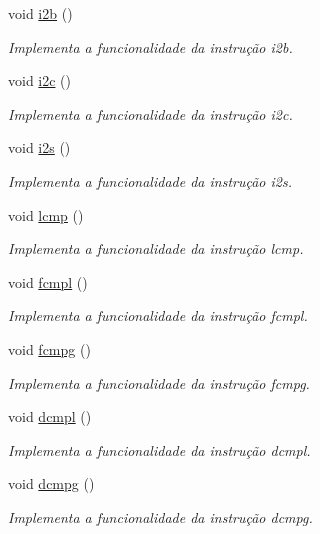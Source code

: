\begin{DoxyCompactItemize}
void \hyperlink{classOperations_adfe0344bae5a1252330b7324e827ed35}{i2b} ()
\begin{DoxyCompactList}\small\item\em Implementa a funcionalidade da instrução i2b. \end{DoxyCompactList}\item 
void \hyperlink{classOperations_a43b01132bf9acf598d0ced8719c194c7}{i2c} ()
\begin{DoxyCompactList}\small\item\em Implementa a funcionalidade da instrução i2c. \end{DoxyCompactList}\item 
void \hyperlink{classOperations_ab83ebb06495a6e42c5edeec05e312f8c}{i2s} ()
\begin{DoxyCompactList}\small\item\em Implementa a funcionalidade da instrução i2s. \end{DoxyCompactList}\item 
void \hyperlink{classOperations_a7ad4ad0e417096686b55dde9142b830a}{lcmp} ()
\begin{DoxyCompactList}\small\item\em Implementa a funcionalidade da instrução lcmp. \end{DoxyCompactList}\item 
void \hyperlink{classOperations_aa4a8e2be93a5cc69e40f483958014e39}{fcmpl} ()
\begin{DoxyCompactList}\small\item\em Implementa a funcionalidade da instrução fcmpl. \end{DoxyCompactList}\item 
void \hyperlink{classOperations_a7825305c331404b97ef209a6e6d988ab}{fcmpg} ()
\begin{DoxyCompactList}\small\item\em Implementa a funcionalidade da instrução fcmpg. \end{DoxyCompactList}\item 
void \hyperlink{classOperations_a89e1792d8c650c2274352c534cfbd7c0}{dcmpl} ()
\begin{DoxyCompactList}\small\item\em Implementa a funcionalidade da instrução dcmpl. \end{DoxyCompactList}\item 
void \hyperlink{classOperations_a7c2a5194de7a2a59ada752001b8ece0a}{dcmpg} ()
\begin{DoxyCompactList}\small\item\em Implementa a funcionalidade da instrução dcmpg. \end{DoxyCompactList}\item 

\end{DoxyCompactItemize}
